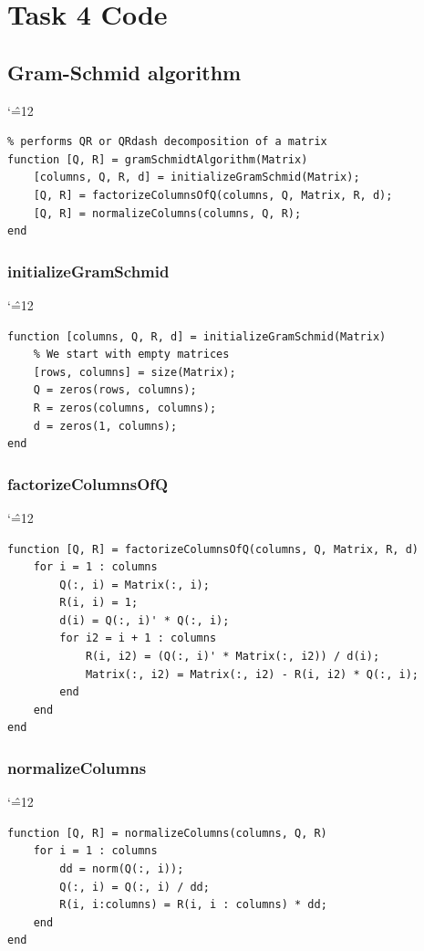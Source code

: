 \documentclass[12pt]{report}
\newenvironment{simplechar}{%
   \catcode`\^=12
}{}
\begin{document}
\section{Task 4 Code}
\subsection{Gram-Schmid algorithm}

\begin{simplechar}
\begin{lstlisting}
% performs QR or QRdash decomposition of a matrix
function [Q, R] = gramSchmidtAlgorithm(Matrix)
    [columns, Q, R, d] = initializeGramSchmid(Matrix);
    [Q, R] = factorizeColumnsOfQ(columns, Q, Matrix, R, d);
    [Q, R] = normalizeColumns(columns, Q, R);
end
\end{lstlisting}
\end{simplechar}

\subsubsection{initializeGramSchmid}
\begin{simplechar}
\begin{lstlisting}
function [columns, Q, R, d] = initializeGramSchmid(Matrix)
    % We start with empty matrices
    [rows, columns] = size(Matrix);
    Q = zeros(rows, columns);
    R = zeros(columns, columns);
    d = zeros(1, columns);
end
\end{lstlisting}
\end{simplechar}

\subsubsection{factorizeColumnsOfQ}
\begin{simplechar}
\begin{lstlisting}
function [Q, R] = factorizeColumnsOfQ(columns, Q, Matrix, R, d)
    for i = 1 : columns
        Q(:, i) = Matrix(:, i);
        R(i, i) = 1;
        d(i) = Q(:, i)' * Q(:, i);
        for i2 = i + 1 : columns
            R(i, i2) = (Q(:, i)' * Matrix(:, i2)) / d(i);
            Matrix(:, i2) = Matrix(:, i2) - R(i, i2) * Q(:, i);
        end
    end
end
\end{lstlisting}
\end{simplechar}

\subsubsection{normalizeColumns}
\begin{simplechar}
\begin{lstlisting}
function [Q, R] = normalizeColumns(columns, Q, R)
    for i = 1 : columns
        dd = norm(Q(:, i));
        Q(:, i) = Q(:, i) / dd;
        R(i, i:columns) = R(i, i : columns) * dd;
    end
end
\end{lstlisting}
\end{simplechar}
\end{document}
